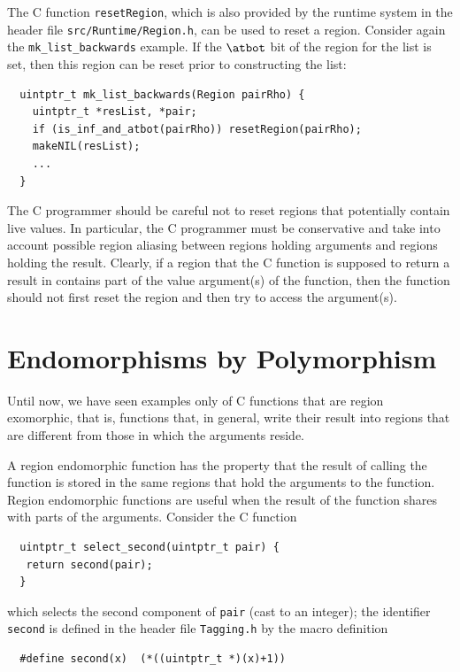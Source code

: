 \documentclass[12pt]{book}
\begin{document}
The C function \texttt{resetRegion}, which is also provided by the
runtime system in the header file {\tt src/Runtime/Region.h}, can be
used to reset a region. Consider again the \verb|mk_list_backwards|
example. If the $\atbot$ bit of the region for the list is set, then
this region can be reset prior to constructing the list:
%
\begin{verbatim}
  uintptr_t mk_list_backwards(Region pairRho) {
    uintptr_t *resList, *pair;
    if (is_inf_and_atbot(pairRho)) resetRegion(pairRho);
    makeNIL(resList);
    ...
  }
\end{verbatim}
The C programmer should be careful not to reset regions that
potentially contain live values. In particular, the C programmer must be
conservative and take into account possible region aliasing between
regions holding arguments and regions holding the result.
Clearly, if a region that the C function is supposed to
return a result in contains part of the value argument(s) of the function,
then the function should not first reset the region and
then try to access the argument(s).

\section{Endomorphisms by Polymorphism}
\label{C_polymorphism.sec}
Until now, we have seen examples only of C functions that are region
exomorphic, that is, functions that, in general, write their result
into regions that are different from those in which the arguments
reside.

A region endomorphic function has the property that the result of
calling the function is stored in the same regions that hold the
arguments to the function. Region endomorphic functions are useful
when the result of the function shares with parts of the arguments.
Consider the C function
\begin{verbatim}
  uintptr_t select_second(uintptr_t pair) {
   return second(pair);
  }
\end{verbatim}
which selects the second component of {\tt pair} (cast to an
integer); the identifier {\tt second} is defined in the header
file {\tt Tagging.h} by the macro definition
\begin{verbatim}
  #define second(x)  (*((uintptr_t *)(x)+1))
\end{verbatim}
\end{document}
